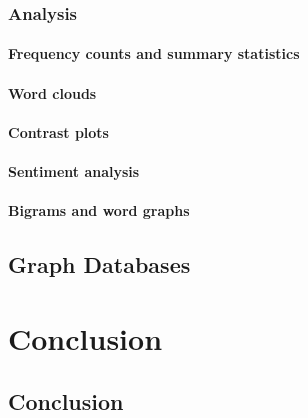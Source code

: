 \documentclass[
]{book}
\begin{document}
\hypertarget{analysis}{%
\section{Analysis}\label{analysis}}

\hypertarget{frequency-counts-and-summary-statistics}{%
\subsection{Frequency counts and summary statistics}\label{frequency-counts-and-summary-statistics}}

\hypertarget{word-clouds}{%
\subsection{Word clouds}\label{word-clouds}}

\hypertarget{contrast-plots}{%
\subsection{Contrast plots}\label{contrast-plots}}

\hypertarget{sentiment-analysis}{%
\subsection{Sentiment analysis}\label{sentiment-analysis}}

\hypertarget{bigrams-and-word-graphs}{%
\subsection{Bigrams and word graphs}\label{bigrams-and-word-graphs}}

\hypertarget{graph_dbs}{%
\chapter{Graph Databases}\label{graph_dbs}}

\hypertarget{part-conclusion}{%
\part*{Conclusion}\label{part-conclusion}}

\hypertarget{conclusion}{%
\chapter{Conclusion}\label{conclusion}}
\end{document}

